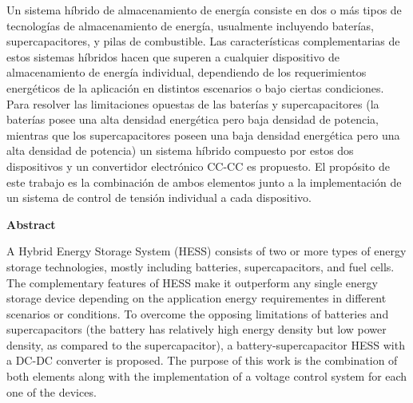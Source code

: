 \newenvironment{abstractpage}
  {\cleardoublepage\vspace*{\fill}\thispagestyle{empty}}
  {\vfill\cleardoublepage}
\renewenvironment{abstract}[1]
  {\bigskip%
   \begin{center}\bfseries\abstractname\end{center}}
  {\par\bigskip}

\begin{abstractpage}
\begin{abstract}
    .Un sistema híbrido de almacenamiento de energía consiste en dos o más tipos de tecnologías de almacenamiento de energía, usualmente incluyendo baterías, supercapacitores, y pilas de combustible. Las características complementarias de estos sistemas híbridos hacen que superen a cualquier dispositivo de almacenamiento de energía individual, dependiendo de los requerimientos energéticos de la aplicación en distintos escenarios o bajo ciertas condiciones. Para resolver las limitaciones opuestas de las baterías y supercapacitores (la baterías posee una alta densidad energética pero baja densidad de potencia, mientras que los supercapacitores poseen una baja densidad energética pero una alta densidad de potencia) un sistema híbrido compuesto por estos dos dispositivos y un convertidor electrónico CC-CC es propuesto. El propósito de este trabajo es la combinación de ambos elementos junto a la implementación de un sistema de control de tensión individual a cada dispositivo. 
\end{abstract}

\renewcommand{\abstractname}{Abstract}

\begin{abstract}
    .A Hybrid Energy Storage System (HESS) consists of two or more types of energy storage technologies, mostly including batteries, supercapacitors, and fuel cells. The complementary features of HESS make it outperform any single energy storage device depending on the application energy requirementes in different scenarios or conditions. To overcome the opposing limitations of batteries and supercapacitors (the battery has relatively high energy density but low power density, as compared to the supercapacitor), a battery-supercapacitor HESS with a DC-DC converter is proposed. The purpose of this work is the combination  of both elements along with the implementation of a voltage control system for each one of the devices.
\end{abstract}
\end{abstractpage}